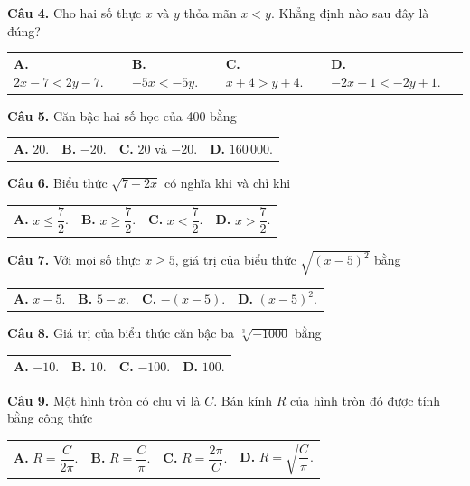 \documentclass[11pt,a4paper]{article}
\begin{document}
\vspace{1.5mm}
\textbf{Câu 4.} Cho hai số thực $x$ và $y$ thỏa mãn $x < y$. Khẳng định nào sau đây là đúng?\\
\begin{tabularx}{\linewidth}{XXXX}
\textbf{A.} $2x - 7 < 2y - 7$. & \textbf{B.} $-5x < -5y$. & \textbf{C.} $x + 4 > y + 4$. & \textbf{D.} $-2x + 1 < -2y + 1$.
\end{tabularx}

\vspace{1.5mm}
\textbf{Câu 5.} Căn bậc hai số học của 400 bằng\\
\begin{tabularx}{\linewidth}{XXXX}
\textbf{A.} $20$. & \textbf{B.} $-20$. & \textbf{C.} $20$ và $-20$. & \textbf{D.} $160\,000$.
\end{tabularx}

\vspace{1.5mm}
\textbf{Câu 6.} Biểu thức $\sqrt{7 - 2x}$ có nghĩa khi và chỉ khi\\
\begin{tabularx}{\linewidth}{XXXX}
\textbf{A.} $x \le \dfrac{7}{2}$. & \textbf{B.} $x \ge \dfrac{7}{2}$. & \textbf{C.} $x < \dfrac{7}{2}$. & \textbf{D.} $x > \dfrac{7}{2}$.
\end{tabularx}

\vspace{1.5mm}
\textbf{Câu 7.} Với mọi số thực $x \ge 5$, giá trị của biểu thức $\sqrt{(x - 5)^2}$ bằng\\
\begin{tabularx}{\linewidth}{XXXX}
\textbf{A.} $x - 5$. & \textbf{B.} $5 - x$. & \textbf{C.} $-(x - 5)$. & \textbf{D.} $(x - 5)^2$.
\end{tabularx}

\vspace{1.5mm}
\textbf{Câu 8.} Giá trị của biểu thức căn bậc ba $\sqrt[3]{-1000}$ bằng\\
\begin{tabularx}{\linewidth}{XXXX}
\textbf{A.} $-10$. & \textbf{B.} $10$. & \textbf{C.} $-100$. & \textbf{D.} $100$.
\end{tabularx}

\vspace{1.5mm}
\textbf{Câu 9.} Một hình tròn có chu vi là $C$. Bán kính $R$ của hình tròn đó được tính bằng công thức\\
\begin{tabularx}{\linewidth}{XXXX}
\textbf{A.} $R = \dfrac{C}{2\pi}$. & \textbf{B.} $R = \dfrac{C}{\pi}$. & \textbf{C.} $R = \dfrac{2\pi}{C}$. & \textbf{D.} $R = \sqrt{\dfrac{C}{\pi}}$.
\end{tabularx}
\end{document}
